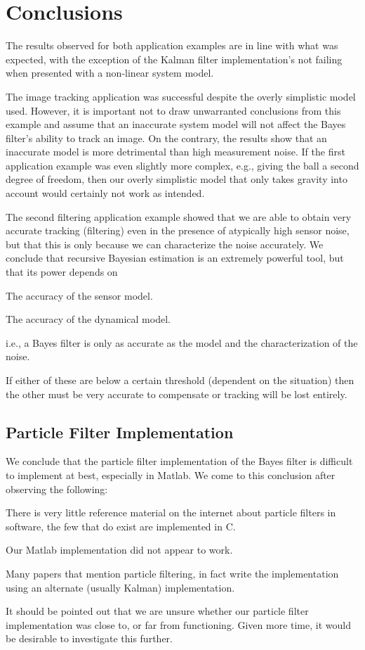 \section{Conclusions}
The results observed for both application examples are in line with what was
expected, with the exception of the Kalman filter implementation's not failing
when presented with a non-linear system model.

The image tracking application was successful despite the overly simplistic 
model used. However, it is important not to draw unwarranted conclusions 
from this example and assume that an
inaccurate system model will not affect the Bayes filter's ability to track an
image. On the contrary, the results show that an inaccurate model is
more detrimental than high measurement noise. If the first application example 
was even slightly
more complex, e.g., giving the ball a second degree of freedom, then our
overly simplistic model that only takes gravity into account would certainly not
work as intended.

The second filtering application example showed that we are able to obtain very accurate tracking 
(filtering) even in the presence of atypically high sensor noise, but that this
is only because we can characterize the noise accurately. We conclude that 
recursive Bayesian estimation is an extremely powerful tool, but that its power
depends on
\begin{compactitem}
\item The accuracy of the sensor model.
\item The accuracy of the dynamical model.
\end{compactitem}
i.e., a Bayes filter is only as accurate as the model and the characterization 
of the noise.

If either of these are below a certain threshold (dependent on the situation) 
then the other must be very accurate to compensate or tracking will be lost
entirely.

\subsection{Particle Filter Implementation}
We conclude that the particle filter implementation of the Bayes filter is 
difficult to implement at best, especially in Matlab. We come to this conclusion
after observing the following:
\begin{compactitem}
\item There is very little reference material on the internet about particle filters
in software, the few that do exist are implemented in C.
\item Our Matlab implementation did not appear to work.
\item Many papers that mention particle filtering, in fact write the implementation
using an alternate (usually Kalman) implementation.
\end{compactitem}
It should be pointed out that we are unsure whether our particle filter implementation
was close to, or far from functioning. Given more time, it would be desirable to 
investigate this further.


